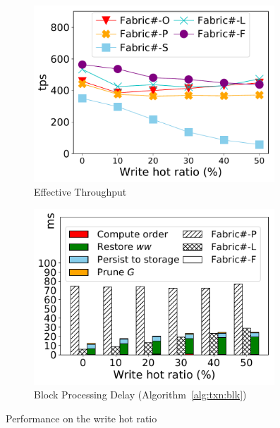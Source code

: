 \begin{figure}[t]
	\centering
    \begin{subfigure}{0.45\textwidth}
      \includegraphics[width=0.99\textwidth]{chart/txn/complex_writehot_thruput.pdf}
      \caption{Effective Throughput}
      \label{chart:txn:writehot:thruput}
    \end{subfigure}
    \begin{subfigure}{0.45\textwidth}
      \includegraphics[width=0.99\textwidth]{chart/txn/complex_writehot_blk_delay.pdf}
      \caption{Block Processing Delay (Algorithm~\ref{alg:txn:blk})}
      \label{chart:txn:writehot:delay}
    \end{subfigure}
    \caption{Performance on the write hot ratio}
    \label{chart:txn:writehot}
\end{figure}
